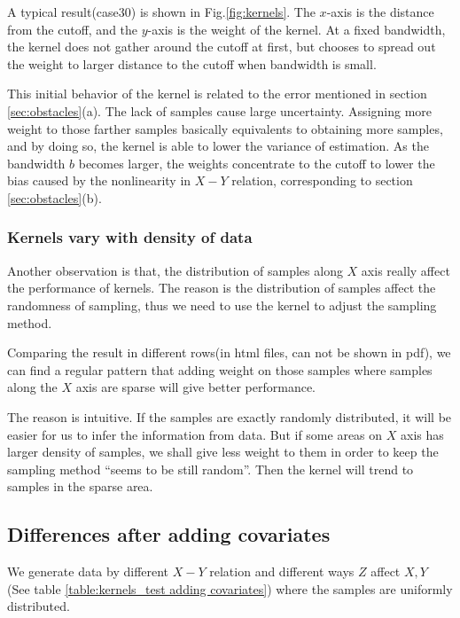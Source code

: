 \documentclass[a4 paper,12pt]{article}
\begin{document}
A typical result(case30) is shown in Fig.\ref{fig:kernels}. The $x$-axis is the distance from the cutoff, and the $y$-axis is the weight of the kernel. At a fixed bandwidth, the kernel does not gather around the cutoff at first, but chooses to spread out the weight to larger distance to the cutoff when bandwidth is small.

This initial behavior of the kernel is related to the error mentioned in section \ref{sec:obstacles}(a). The lack of samples cause large uncertainty. Assigning more weight to those farther samples basically equivalents to obtaining more samples, and by doing so, the kernel is able to lower the variance of estimation. As the bandwidth $b$ becomes larger, the weights concentrate to the cutoff to lower the bias caused by the nonlinearity in $X-Y$ relation, corresponding to section \ref{sec:obstacles}(b).

\subsubsection*{Kernels vary with density of data}

Another observation is that, the distribution of samples along $X$ axis really affect the performance of kernels. The reason is the distribution of samples affect the randomness of sampling, thus we need to use the kernel to adjust the sampling method.

Comparing the result in different rows(in html files, can not be shown in pdf), we can find a regular pattern that adding weight on those samples where samples along the $X$ axis are sparse will give better performance. 

The reason is intuitive. If the samples are exactly randomly distributed, it will be easier for us to infer the information from data. But if some areas on $X$ axis has larger density of samples, we shall give less weight to them in order to keep the sampling method ``seems to be still random''. Then the kernel will trend to samples in the sparse area.

\subsection{ Differences after adding covariates}
We generate data by different $X-Y$ relation and different ways $Z$ affect $X,Y$ (See table \ref{table:kernels_test adding covariates}) where the samples are uniformly distributed.
\end{document}
